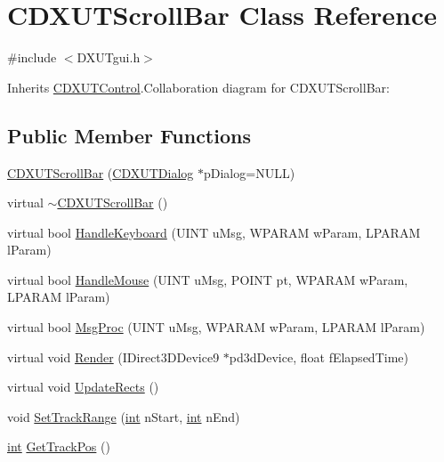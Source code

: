 \hypertarget{class_c_d_x_u_t_scroll_bar}{
\section{CDXUTScrollBar Class Reference}
\label{class_c_d_x_u_t_scroll_bar}
}


{\ttfamily \#include $<$DXUTgui.h$>$}

Inherits \hyperlink{class_c_d_x_u_t_control}{CDXUTControl}.Collaboration diagram for CDXUTScrollBar:\subsection*{Public Member Functions}
\begin{DoxyCompactItemize}
\item 
\hyperlink{class_c_d_x_u_t_scroll_bar_accc3179c9b36ece4b5560bb1310689e7}{CDXUTScrollBar} (\hyperlink{class_c_d_x_u_t_dialog}{CDXUTDialog} $\ast$pDialog=NULL)
\item 
virtual \hyperlink{class_c_d_x_u_t_scroll_bar_a8ebd4d8debf6a5f0f746dd3621162a75}{$\sim$CDXUTScrollBar} ()
\item 
virtual bool \hyperlink{class_c_d_x_u_t_scroll_bar_a07c561820f6f3362f94a391c7ff58b04}{HandleKeyboard} (UINT uMsg, WPARAM wParam, LPARAM lParam)
\item 
virtual bool \hyperlink{class_c_d_x_u_t_scroll_bar_aa0c2286530836c1ed431dea5760280da}{HandleMouse} (UINT uMsg, POINT pt, WPARAM wParam, LPARAM lParam)
\item 
virtual bool \hyperlink{class_c_d_x_u_t_scroll_bar_a8c4363b3a1415d06e22906e706e1ff76}{MsgProc} (UINT uMsg, WPARAM wParam, LPARAM lParam)
\item 
virtual void \hyperlink{class_c_d_x_u_t_scroll_bar_a57f6ed8cfcb605406dc8500e8ff86538}{Render} (IDirect3DDevice9 $\ast$pd3dDevice, float fElapsedTime)
\item 
virtual void \hyperlink{class_c_d_x_u_t_scroll_bar_ae25e1547d974b0913688da998e43d331}{UpdateRects} ()
\item 
void \hyperlink{class_c_d_x_u_t_scroll_bar_ae8eb89fb79562550d1c481ba5f268522}{SetTrackRange} (\hyperlink{_d_x_u_tgui_8cpp_a2d77ed03302b6978834ee3b6f57837fb}{int} nStart, \hyperlink{_d_x_u_tgui_8cpp_a2d77ed03302b6978834ee3b6f57837fb}{int} nEnd)
\item 
\hyperlink{_d_x_u_tgui_8cpp_a2d77ed03302b6978834ee3b6f57837fb}{int} \hyperlink{class_c_d_x_u_t_scroll_bar_a96acaab90a5e33368ad8af53cb111e38}{GetTrackPos} ()
\item 

\end{DoxyCompactItemize}

